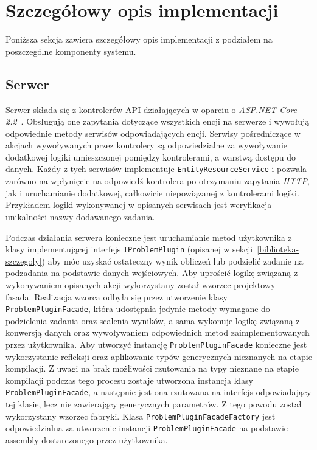\documentclass[a4paper,11pt,twoside]{report}
\theoremstyle{definition}
\begin{document}
\section{Szczegółowy opis implementacji}

Poniższa sekcja zawiera szczegółowy opis implementacji z podziałem na poszczególne komponenty systemu.


\subsection{Serwer}

Serwer składa się z kontrolerów API działających w oparciu o \textit{ASP.NET Core 2.2}~\cite{aspnet-core}.
Obsługują one zapytania dotyczące wszystkich encji na serwerze i wywołują odpowiednie metody serwisów odpowiadających encji.
Serwisy pośredniczące w akcjach wywoływanych przez kontrolery są odpowiedzialne za wywoływanie dodatkowej logiki umieszczonej pomiędzy kontrolerami, a warstwą dostępu do danych.
Każdy z tych serwisów implementuje \texttt{EntityResourceService} i pozwala zarówno na wpłynięcie na odpowiedź kontrolera po otrzymaniu zapytania \textit{HTTP}, jak i uruchamianie dodatkowej, całkowicie niepowiązanej z kontrolerami logiki.
Przykładem logiki wykonywanej w opisanych serwisach jest weryfikacja unikalności nazwy dodawanego zadania.

Podczas działania serwera konieczne jest uruchamianie metod użytkownika z klasy implementującej interfejs \texttt{IProblemPlugin} (opisanej w sekcji~\ref{biblioteka-szczegoly}) aby móc uzyskać ostateczny wynik obliczeń lub podzielić zadanie na podzadania na podstawie danych wejściowych.
Aby uprościć logikę związaną z wykonywaniem opisanych akcji wykorzystany został wzorzec projektowy --- fasada.
Realizacja wzorca odbyła się przez utworzenie klasy \texttt{ProblemPluginFacade}, która udostępnia jedynie metody wymagane do podzielenia zadania oraz scalenia wyników, a sama wykonuje logikę związaną z konwersją danych oraz wywoływaniem odpowiednich metod zaimplementowanych przez użytkownika.
Aby utworzyć instancję \texttt{ProblemPluginFacade} konieczne jest wykorzystanie refleksji oraz aplikowanie typów generycznych nieznanych na etapie kompilacji.
Z uwagi na brak możliwości rzutowania na typy nieznane na etapie kompilacji podczas tego procesu zostaje utworzona instancja klasy \texttt{ProblemPluginFacade}, a następnie jest ona rzutowana na interfejs odpowiadający tej klasie, lecz nie zawierający generycznych parametrów.
Z tego powodu został wykorzystany wzorzec fabryki.
Klasa \texttt{ProblemPluginFacadeFactory} jest odpowiedzialna za utworzenie instancji \texttt{ProblemPluginFacade} na podstawie assembly dostarczonego przez użytkownika.
\end{document}
